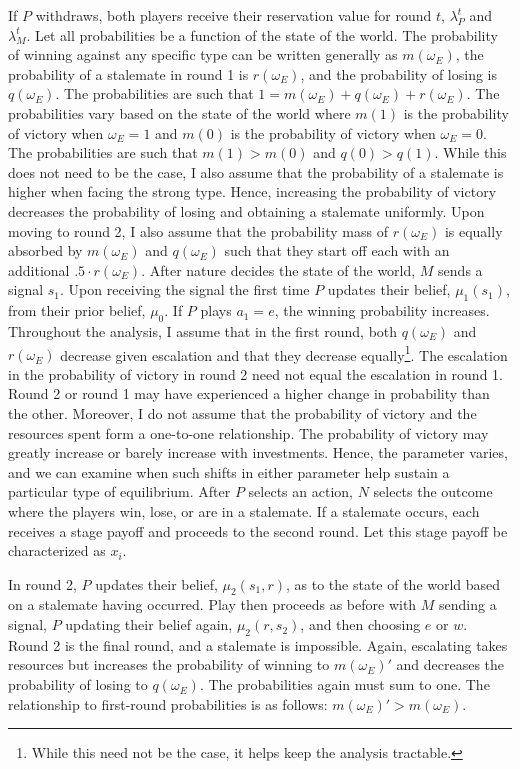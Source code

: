 \documentclass[
  12pt,
]{article}
\theoremstyle{plain}
\theoremstyle{plain}
\theoremstyle{remark}
\begin{document}
If \(P\) withdraws, both players receive their reservation value for
round \(t\), \(\lambda_{P}^t\) and \(\lambda_{M}^t\). Let all
probabilities be a function of the state of the world. The probability
of winning against any specific type can be written generally as
\(m(\omega_E)\), the probability of a stalemate in round 1 is
\(r(\omega_E)\), and the probability of losing is \(q(\omega_E)\). The
probabilities are such that
\(1 = m(\omega_E) + q(\omega_E) + r(\omega_E)\). The probabilities vary
based on the state of the world where \(m(1)\) is the probability of
victory when \(\omega_E = 1\) and \(m(0)\) is the probability of victory
when \(\omega_E = 0\). The probabilities are such that \(m(1) > m(0)\)
and \(q(0) > q(1)\). While this does not need to be the case, I also
assume that the probability of a stalemate is higher when facing the
strong type. Hence, increasing the probability of victory decreases the
probability of losing and obtaining a stalemate uniformly. Upon moving
to round 2, I also assume that the probability mass of \(r(\omega_E)\)
is equally absorbed by \(m(\omega_E)\) and \(q(\omega_E)\) such that
they start off each with an additional \(.5 \cdot r(\omega_E)\). After
nature decides the state of the world, \(M\) sends a signal \(s_1\).
Upon receiving the signal the first time \(P\) updates their belief,
\(\mu_1(s_1)\), from their prior belief, \(\mu_0\). If \(P\) plays
\(a_1 = e\), the winning probability increases. Throughout the analysis,
I assume that in the first round, both \(q(\omega_E)\) and
\(r(\omega_E)\) decrease given escalation and that they decrease
equally\footnote{While this need not be the case, it helps keep the
  analysis tractable.}. The escalation in the probability of victory in
round 2 need not equal the escalation in round 1. Round 2 or round 1 may
have experienced a higher change in probability than the other.
Moreover, I do not assume that the probability of victory and the
resources spent form a one-to-one relationship. The probability of
victory may greatly increase or barely increase with investments. Hence,
the parameter varies, and we can examine when such shifts in either
parameter help sustain a particular type of equilibrium. After \(P\)
selects an action, \(N\) selects the outcome where the players win,
lose, or are in a stalemate. If a stalemate occurs, each receives a
stage payoff and proceeds to the second round. Let this stage payoff be
characterized as \(x_i\).

In round 2, \(P\) updates their belief, \(\mu_2(s_1, r)\), as to the
state of the world based on a stalemate having occurred. Play then
proceeds as before with \(M\) sending a signal, \(P\) updating their
belief again, \(\mu_2(r, s_2)\), and then choosing \(e\) or \(w\). Round
2 is the final round, and a stalemate is impossible. Again, escalating
takes resources but increases the probability of winning to
\(m(\omega_E)'\) and decreases the probability of losing to
\(q(\omega_E)\). The probabilities again must sum to one. The
relationship to first-round probabilities is as follows:
\(m(\omega_E)' > m(\omega_E)\).
\end{document}
